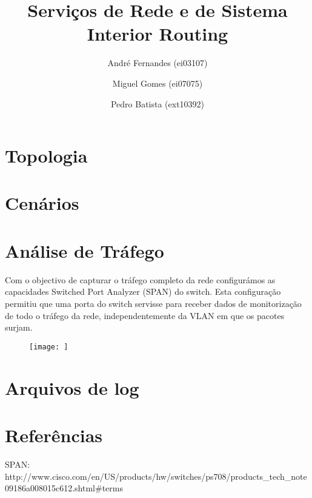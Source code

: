 \documentclass[a4paper,12pt]{article}
\title{Serviços de Rede e de Sistema \\
Interior Routing }
\author{André Fernandes (ei03107) \and Miguel Gomes (ei07075) \and Pedro Batista (ext10392)}
\begin{document}
\maketitle

\section{Topologia}

\section{Cenários}

\section{Análise de Tráfego}

	Com o objectivo de capturar o tráfego completo da rede configurámos as capacidades Switched Port Analyzer (SPAN) do switch. Esta configuração permitiu que uma porta do switch servisse para receber dados de monitorização de todo o tráfego da rede, independentemente da VLAN em que os pacotes surjam.


	\begin{figure}[htp]
   	\begin{center}
	 		\texttt{[image: ]}
		\end{center}
		\caption{}
		\label{fig:}
	\end{figure}

\section{Arquivos de log}

\section{Referências}

SPAN: http://www.cisco.com/en/US/products/hw/switches/ps708/products_tech_note09186a008015c612.shtml#terms
\end{document}
